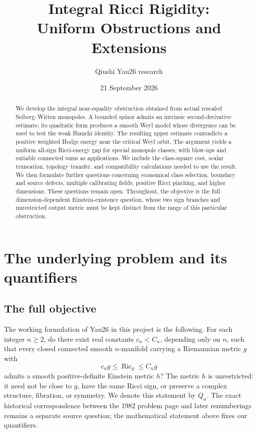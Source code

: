 \documentclass[11pt,a4paper]{article}
\title{Integral Ricci Rigidity:\\ Uniform Obstructions and Extensions}
\author{Qiushi Yau26 research}
\date{21 September 2026}
\theoremstyle{definition}
\theoremstyle{remark}
\DeclareMathOperator{\Ric}{Ric}
\numberwithin{equation}{section}
\begin{document}
\maketitle
\begin{abstract}
We develop the integral near-equality obstruction obtained from actual
rescaled Seiberg--Witten monopoles. A bounded spinor admits an intrinsic
second-derivative estimate; its quadratic form produces a smooth Weyl
model whose divergence can be used to test the weak Bianchi identity.
The resulting upper estimate contradicts a positive weighted Hodge
energy near the critical Weyl orbit. The argument yields a uniform
all-sign Ricci-energy gap for special monopole classes, with blow-ups
and suitable connected sums as applications. We include the class-square
cost, scalar truncation, topology transfer, and compatibility calculations
needed to use the result. We then formulate further questions concerning
economical class selection, boundary and source defects, multiple
calibrating fields, positive Ricci pinching, and higher dimensions.
These questions remain open. Throughout, the objective is the full
dimension-dependent Einstein-existence question, whose two sign branches
and unrestricted output metric must be kept distinct from the range of
this particular obstruction.
\end{abstract}
\tableofcontents

\section{The underlying problem and its quantifiers}\label{sec:problem}
\subsection{The full objective}\label{sub:full-objective}
The working formulation of Yau26 in this project is the following.
For each integer $n\ge2$, do there exist real constants $c_n<C_n$,
depending only on $n$, such that every closed connected smooth
$n$-manifold carrying a Riemannian metric $g$ with
\[
                 c_ng\le\Ric_g\le C_ng
\]
admits a smooth positive-definite Einstein metric $h$?
The metric $h$ is unrestricted: it need not be close to $g$, have the
same Ricci sign, or preserve a complex structure, fibration, or symmetry.
We denote this statement by $Q_n$. The exact historical correspondence
between the 1982 problem page and later renumberings remains a separate
source question; the mathematical statement above fixes our quantifiers.
\end{document}
